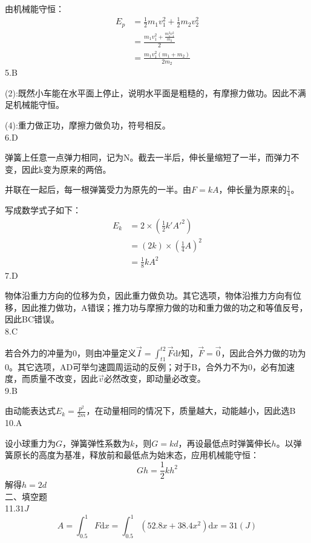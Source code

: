 \documentclass[a4paper,fleqn,twocolumn]{article}
\newcommand{\di}[1]{\mathrm{d}#1}
\begin{document}
        由机械能守恒：
        \begin{align*}
            E_p &=\frac{1}{2}m_1v_1^2+\frac{1}{2}m_2v_2^2\\
                &=\frac{m_1v_1^2+\frac{m_1^2v_1^2}{m_2}}{2}\\
                &=\frac{m_1v_1^2\left(m_1+m_2\right)}{2m_2}
        \end{align*}
        5.B\par
        (2):既然小车能在水平面上停止，说明水平面是粗糙的，有摩擦力做功。因此不满足机械能守恒。\par
        (4):重力做正功，摩擦力做负功，符号相反。\\
        6.D\par
        弹簧上任意一点弹力相同，记为N。截去一半后，伸长量缩短了一半，而弹力不变，因此k变为原来的两倍。\par
        并联在一起后，每一根弹簧受力为原先的一半。由$F=kA$，伸长量为原来的$\frac{1}{4}$。\par
        写成数学式子如下：
        \begin{align*}
            E_k &=2\times\left(\frac{1}{2}k'A'^2\right)\\
                &=\left(2k\right)\times\left(\frac{1}{4}A\right)^2\\
                &=\frac{1}{8}kA^2
        \end{align*}
        7.D\par 
        物体沿重力方向的位移为负，因此重力做负功。其它选项，物体沿推力方向有位移，因此推力做功，A错误；推力功与摩擦力做的功和重力做的功之和等值反号，因此BC错误。\\
        8.C\par 
        若合外力的冲量为0，则由冲量定义$\vec{I}=\int_{t1}^{t2}\vec{F}\di{t}$知，$\vec{F}=\vec{0}$，因此合外力做的功为0。其它选项，AD可举匀速圆周运动的反例；对于B，合外力不为0，必有加速度，而质量不改变，因此$\vec{v}$必然改变，即动量必改变。\\
        9.B\par 
        由动能表达式$E_k=\frac{p^2}{2m}$，在动量相同的情况下，质量越大，动能越小，因此选B\\
        10.A\par 
        设小球重力为$G$，弹簧弹性系数为$k$，则$G=kd$，再设最低点时弹簧伸长$h$。以弹簧原长的高度为基准，释放前和最低点为始末态，应用机械能守恒：
        \[Gh=\frac{1}{2}kh^2\]
        解得$h=2d$\\
    二、填空题\\
    	11.$31J$
    	\[A=\int_{0.5}^{1}F\di{x}=\int_{0.5}^{1}(52.8x+38.4x^2)\di{x}=31(J)\]
\end{document}
